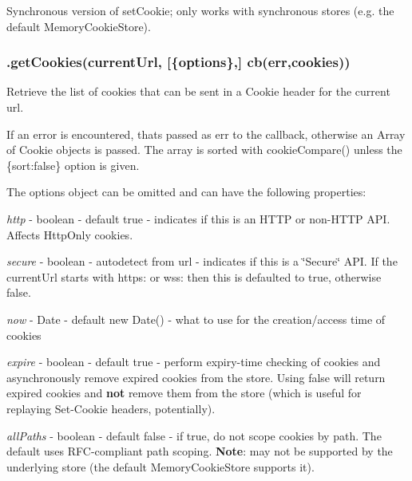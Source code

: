 Synchronous version of {\ttfamily set\+Cookie}; only works with synchronous stores (e.\+g. the default {\ttfamily Memory\+Cookie\+Store}).

\subsubsection*{{\ttfamily .get\+Cookies(current\+Url, \mbox{[}\{options\},\mbox{]} cb(err,cookies))}}

Retrieve the list of cookies that can be sent in a Cookie header for the current url.

If an error is encountered, that\textquotesingle{}s passed as {\ttfamily err} to the callback, otherwise an {\ttfamily Array} of {\ttfamily Cookie} objects is passed. The array is sorted with {\ttfamily cookie\+Compare()} unless the {\ttfamily \{sort\+:false\}} option is given.

The {\ttfamily options} object can be omitted and can have the following properties\+:


\begin{DoxyItemize}
\item {\itshape http} -\/ boolean -\/ default {\ttfamily true} -\/ indicates if this is an H\+T\+TP or non-\/\+H\+T\+TP A\+PI. Affects Http\+Only cookies.
\item {\itshape secure} -\/ boolean -\/ autodetect from url -\/ indicates if this is a \char`\"{}\+Secure\char`\"{} A\+PI. If the current\+Url starts with {\ttfamily https\+:} or {\ttfamily wss\+:} then this is defaulted to {\ttfamily true}, otherwise {\ttfamily false}.
\item {\itshape now} -\/ Date -\/ default {\ttfamily new Date()} -\/ what to use for the creation/access time of cookies
\item {\itshape expire} -\/ boolean -\/ default {\ttfamily true} -\/ perform expiry-\/time checking of cookies and asynchronously remove expired cookies from the store. Using {\ttfamily false} will return expired cookies and {\bfseries not} remove them from the store (which is useful for replaying Set-\/\+Cookie headers, potentially).
\item {\itshape all\+Paths} -\/ boolean -\/ default {\ttfamily false} -\/ if {\ttfamily true}, do not scope cookies by path. The default uses R\+F\+C-\/compliant path scoping. {\bfseries Note}\+: may not be supported by the underlying store (the default {\ttfamily Memory\+Cookie\+Store} supports it).
\end{DoxyItemize}

